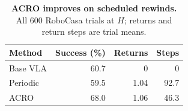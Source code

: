 \begin{table}
\vspace{-4pt}
\captionsetup{justification=raggedright,singlelinecheck=false}
\centering
\small
\setlength{\tabcolsep}{4pt}
\caption{\textbf{ACRO improves on scheduled rewinds.} All 600 RoboCasa trials at $H$; returns and return steps are trial means.}
\label{tab:periodic-rewind}
\begin{tabular}{@{}lrrr@{}}
\toprule
Method & Success (\%) & Returns & Steps \\
\midrule
Base VLA & 60.7 & 0 & 0 \\
Periodic & 59.5 & 1.04 & 92.7 \\
\rowcolor{linkblue!12}
ACRO & 68.0 & 1.06 & 46.3 \\
\bottomrule
\end{tabular}
\end{table}
